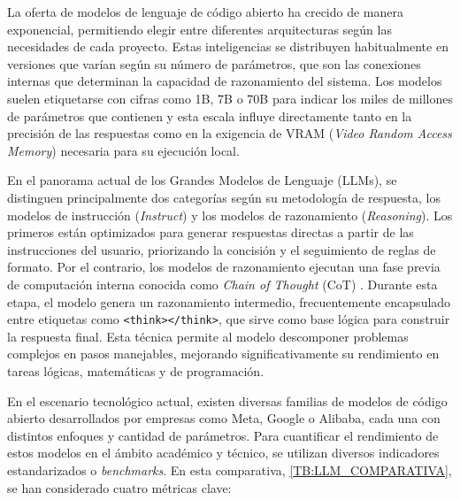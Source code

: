 La oferta de modelos de lenguaje de código abierto ha crecido de manera exponencial, permitiendo elegir entre diferentes arquitecturas según las necesidades de cada proyecto. Estas inteligencias se distribuyen habitualmente en versiones que varían según su número de parámetros, que son las conexiones internas que determinan la capacidad de razonamiento del sistema. Los modelos suelen etiquetarse con cifras como 1B, 7B o 70B para indicar los miles de millones de parámetros que contienen y esta escala influye directamente tanto en la precisión de las respuestas como en la exigencia de VRAM (\textit{Video Random Access Memory}) necesaria para su ejecución local.

En el panorama actual de los Grandes Modelos de Lenguaje (LLMs), se distinguen principalmente dos categorías según su metodología de respuesta, los modelos de instrucción (\textit{Instruct}) y los modelos de razonamiento (\textit{Reasoning}). Los primeros están optimizados para generar respuestas directas a partir de las instrucciones del usuario, priorizando la concisión y el seguimiento de reglas de formato. Por el contrario, los modelos de razonamiento ejecutan una fase previa de computación interna conocida como \textit{Chain of Thought} (CoT) \cite{wei2022chain}. Durante esta etapa, el modelo genera un razonamiento intermedio, frecuentemente encapsulado entre etiquetas como \texttt{<think></think>}, que sirve como base lógica para construir la respuesta final. Esta técnica permite al modelo descomponer problemas complejos en pasos manejables, mejorando significativamente su rendimiento en tareas lógicas, matemáticas y de programación.

En el escenario tecnológico actual, existen diversas familias de modelos de código abierto desarrollados por empresas como Meta, Google o Alibaba, cada una con distintos enfoques y cantidad de parámetros. Para cuantificar el rendimiento de estos modelos en el ámbito académico y técnico, se utilizan diversos indicadores estandarizados o \textit{benchmarks}. En esta comparativa, \autoref{TB:LLM_COMPARATIVA}, se han considerado cuatro métricas clave: 

